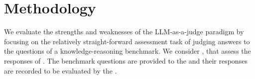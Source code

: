 

\section{Methodology} 
\label{sec:methodology}


We evaluate the strengths and weaknesses of the LLM-as-a-judge paradigm by focusing on the relatively straight-forward assessment task of judging answers to the questions of a knowledge-reasoning benchmark.
We consider \njudges \judgemodels, that assess the responses of \nexamtakers \evaluatormodels. 
%
The benchmark questions are provided to the \evaluatormodels and their responses are recorded to be evaluated by the \judgemodels.
%




